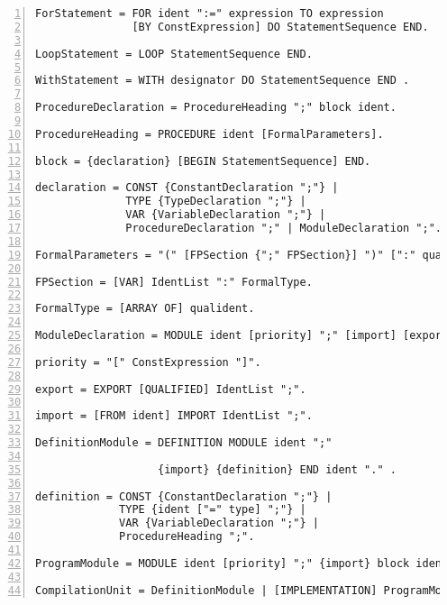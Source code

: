 \begin{Verbatim}[numbers=left]
ForStatement = FOR ident ":=" expression TO expression
               [BY ConstExpression] DO StatementSequence END.
               
LoopStatement = LOOP StatementSequence END.

WithStatement = WITH designator DO StatementSequence END .

ProcedureDeclaration = ProcedureHeading ";" block ident.

ProcedureHeading = PROCEDURE ident [FormalParameters].

block = {declaration} [BEGIN StatementSequence] END.

declaration = CONST {ConstantDeclaration ";"} |
              TYPE {TypeDeclaration ";"} |
              VAR {VariableDeclaration ";"} |
              ProcedureDeclaration ";" | ModuleDeclaration ";".
              
FormalParameters = "(" [FPSection {";" FPSection}] ")" [":" qualident].

FPSection = [VAR] IdentList ":" FormalType.

FormalType = [ARRAY OF] qualident.

ModuleDeclaration = MODULE ident [priority] ";" [import] [export] block ident.

priority = "[" ConstExpression "]".

export = EXPORT [QUALIFIED] IdentList ";".

import = [FROM ident] IMPORT IdentList ";".

DefinitionModule = DEFINITION MODULE ident ";"

                   {import} {definition} END ident "." .
                   
definition = CONST {ConstantDeclaration ";"} |
             TYPE {ident ["=" type] ";"} |
             VAR {VariableDeclaration ";"} |
             ProcedureHeading ";".
             
ProgramModule = MODULE ident [priority] ";" {import} block ident ".".

CompilationUnit = DefinitionModule | [IMPLEMENTATION] ProgramModule.
\end{Verbatim}



